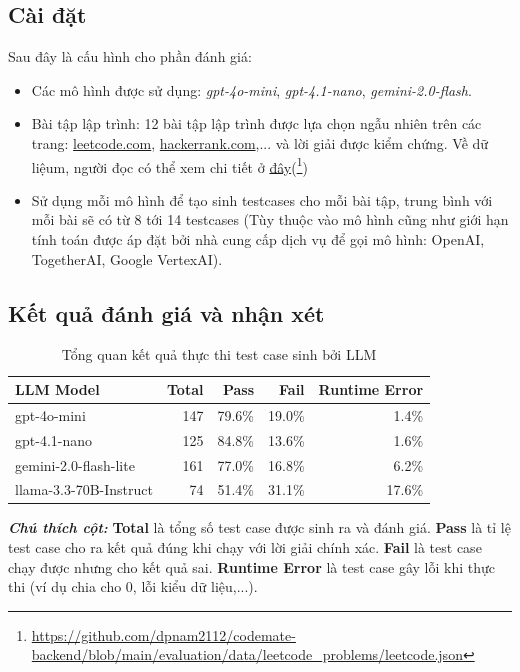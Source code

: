 \subsection{Cài đặt}
Sau đây là cấu hình cho phần đánh giá:
\begin{itemize}
    \item Các mô hình được sử dụng: \emph{gpt-4o-mini}, \emph{gpt-4.1-nano}, \emph{gemini-2.0-flash}.
    \item Bài tập lập trình: 12 bài tập lập trình được lựa chọn ngẫu nhiên trên các trang: \url{leetcode.com}, \url{hackerrank.com},... và lời giải được kiểm chứng. Về dữ liệum, người đọc có thể xem chi tiết ở \href{https://github.com/dpnam2112/codemate-backend/blob/main/evaluation/data/leetcode_problems/leetcode.json}{đây}(\footnote{\url{https://github.com/dpnam2112/codemate-backend/blob/main/evaluation/data/leetcode_problems/leetcode.json}})
    \item Sử dụng mỗi mô hình để tạo sinh testcases cho mỗi bài tập, trung bình với mỗi bài sẽ có từ 8 tới 14 testcases (Tùy thuộc vào mô hình cũng như giới hạn tính toán được áp đặt bởi nhà cung cấp dịch vụ để gọi mô hình: OpenAI, TogetherAI, Google VertexAI).

\end{itemize}

\subsection{Kết quả đánh giá và nhận xét}

\begin{table}[H]
\centering
\begin{tabular}{lrrrr}
\toprule
\textbf{LLM Model} & \textbf{Total} & \textbf{Pass} & \textbf{Fail} & \textbf{Runtime Error} \\
\midrule
gpt-4o-mini            & 147 & 79.6\% & 19.0\% & 1.4\%  \\
gpt-4.1-nano           & 125 & 84.8\% & 13.6\% & 1.6\%  \\
gemini-2.0-flash-lite  & 161 & 77.0\% & 16.8\% & 6.2\% \\
llama-3.3-70B-Instruct & 74  & 51.4\% & 31.1\% & 17.6\% \\
\bottomrule
\end{tabular}
\caption{Tổng quan kết quả thực thi test case sinh bởi LLM}
\vspace{0.5em}
\noindent
\textit{\textbf{Chú thích cột:}} 
\textbf{Total} là tổng số test case được sinh ra và đánh giá. 
\textbf{Pass} là tỉ lệ test case cho ra kết quả đúng khi chạy với lời giải chính xác. 
\textbf{Fail} là test case chạy được nhưng cho kết quả sai. 
\textbf{Runtime Error} là test case gây lỗi khi thực thi (ví dụ chia cho 0, lỗi kiểu dữ liệu,...).
\end{table}

